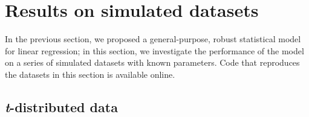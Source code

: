 \documentclass[fleqn,usenatbib]{mnras}
\begin{document}








\section{Results on simulated datasets}
\label{sec:results}

In the previous section, we proposed a general-purpose, robust statistical model
for linear regression; in this section, we investigate the performance of the
model on a series of simulated datasets with known parameters. Code that
reproduces the datasets in this section is available online\footnotemark.


\subsection{\textit{t}-distributed data}
\label{sec:results.t}
\end{document}
